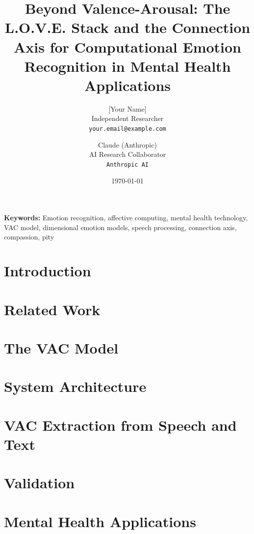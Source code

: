 \documentclass[10pt,twocolumn]{article}
\title{Beyond Valence-Arousal: The L.O.V.E. Stack and the Connection Axis for Computational Emotion Recognition in Mental Health Applications}
\author{
    [Your Name] \\
    Independent Researcher \\
    \texttt{your.email@example.com}
    \and
    Claude (Anthropic) \\
    AI Research Collaborator \\
    \texttt{Anthropic AI}
}
\date{\today}
\begin{document}
\maketitle

\begin{abstract}

\end{abstract}

\noindent
\textbf{Keywords:} Emotion recognition, affective computing, mental health technology, VAC model, dimensional emotion models, speech processing, connection axis, compassion, pity

\section{Introduction}
\label{sec:introduction}


\section{Related Work}
\label{sec:related-work}


\section{The VAC Model}
\label{sec:vac-model}


\section{System Architecture}
\label{sec:architecture}


\section{VAC Extraction from Speech and Text}
\label{sec:vac-extraction}


\section{Validation}
\label{sec:validation}


\section{Mental Health Applications}
\label{sec:mental-health-apps}

\end{document}
